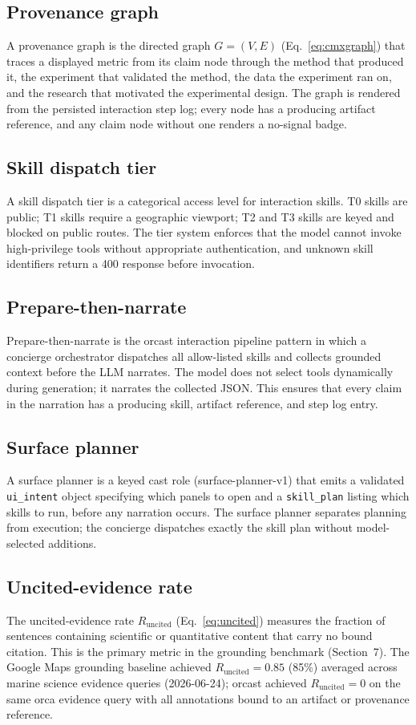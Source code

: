 \subsection*{Provenance graph}
A provenance graph is the directed graph $G = (V, E)$ (Eq.~\ref{eq:cmxgraph}) that traces a displayed metric from its claim node through the method that produced it, the experiment that validated the method, the data the experiment ran on, and the research that motivated the experimental design. The graph is rendered from the persisted interaction step log; every node has a producing artifact reference, and any claim node without one renders a no-signal badge.

\subsection*{Skill dispatch tier}
A skill dispatch tier is a categorical access level for interaction skills. T0 skills are public; T1 skills require a geographic viewport; T2 and T3 skills are keyed and blocked on public routes. The tier system enforces that the model cannot invoke high-privilege tools without appropriate authentication, and unknown skill identifiers return a 400 response before invocation.

\subsection*{Prepare-then-narrate}
Prepare-then-narrate is the orcast interaction pipeline pattern in which a concierge orchestrator dispatches all allow-listed skills and collects grounded context before the LLM narrates. The model does not select tools dynamically during generation; it narrates the collected JSON. This ensures that every claim in the narration has a producing skill, artifact reference, and step log entry.

\subsection*{Surface planner}
A surface planner is a keyed cast role (surface-planner-v1) that emits a validated \texttt{ui\_intent} object specifying which panels to open and a \texttt{skill\_plan} listing which skills to run, before any narration occurs. The surface planner separates planning from execution; the concierge dispatches exactly the skill plan without model-selected additions.

\subsection*{Uncited-evidence rate}
The uncited-evidence rate $R_\mathrm{uncited}$ (Eq.~\ref{eq:uncited}) measures the fraction of sentences containing scientific or quantitative content that carry no bound citation. This is the primary metric in the grounding benchmark (Section~7). The Google Maps grounding baseline achieved $R_\mathrm{uncited} = 0.85$ (85\%) averaged across marine science evidence queries (2026-06-24); orcast achieved $R_\mathrm{uncited} = 0$ on the same orca evidence query with all annotations bound to an artifact or provenance reference.
